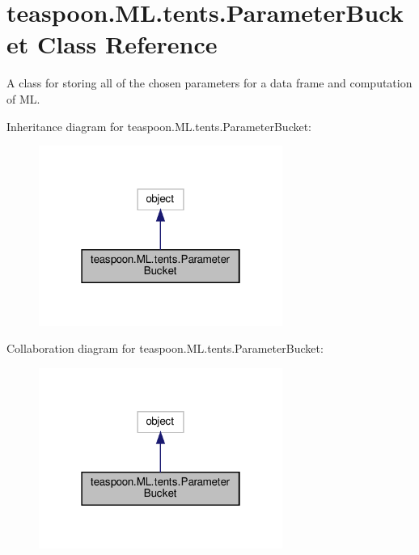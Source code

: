 \hypertarget{classteaspoon_1_1_m_l_1_1tents_1_1_parameter_bucket}{}\section{teaspoon.\+M\+L.\+tents.\+Parameter\+Bucket Class Reference}
\label{classteaspoon_1_1_m_l_1_1tents_1_1_parameter_bucket}


A class for storing all of the chosen parameters for a data frame and computation of ML.




Inheritance diagram for teaspoon.\+M\+L.\+tents.\+Parameter\+Bucket\+:\nopagebreak
\begin{figure}[H]
\begin{center}
\leavevmode
\includegraphics[width=226pt]{classteaspoon_1_1_m_l_1_1tents_1_1_parameter_bucket__inherit__graph}
\end{center}
\end{figure}


Collaboration diagram for teaspoon.\+M\+L.\+tents.\+Parameter\+Bucket\+:\nopagebreak
\begin{figure}[H]
\begin{center}
\leavevmode
\includegraphics[width=226pt]{classteaspoon_1_1_m_l_1_1tents_1_1_parameter_bucket__coll__graph}
\end{center}
\end{figure}
